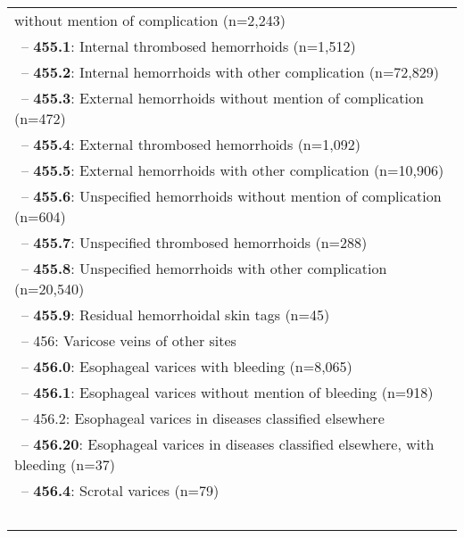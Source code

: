 \begin{longtable}{p{\textwidth}}
without mention of complication (n=2,243)} \\ \-\ \hspace{30pt}\footnotesize{-- {\color{ForestGreen} \textbf{455.1}}: Internal thrombosed hemorrhoids (n=1,512)} \\ \-\ \hspace{30pt}\footnotesize{-- {\color{ForestGreen} \textbf{455.2}}: Internal hemorrhoids with other complication (n=72,829)} \\ \-\ \hspace{30pt}\footnotesize{-- {\color{ForestGreen} \textbf{455.3}}: External hemorrhoids without mention of complication (n=472)} \\ \-\ \hspace{30pt}\footnotesize{-- {\color{ForestGreen} \textbf{455.4}}: External thrombosed hemorrhoids (n=1,092)} \\ \-\ \hspace{30pt}\footnotesize{-- {\color{ForestGreen} \textbf{455.5}}: External hemorrhoids with other complication (n=10,906)} \\ \-\ \hspace{30pt}\footnotesize{-- {\color{ForestGreen} \textbf{455.6}}: Unspecified hemorrhoids without mention of complication (n=604)} \\ \-\ \hspace{30pt}\footnotesize{-- {\color{ForestGreen} \textbf{455.7}}: Unspecified thrombosed hemorrhoids (n=288)} \\ \-\ \hspace{30pt}\footnotesize{-- {\color{ForestGreen} \textbf{455.8}}: Unspecified hemorrhoids with other complication (n=20,540)} \\ \-\ \hspace{30pt}\footnotesize{-- {\color{ForestGreen} \textbf{455.9}}: Residual hemorrhoidal skin tags (n=45)} \\ \-\ \hspace{20pt}\footnotesize{-- 456: Varicose veins of other sites} \\ \-\ \hspace{30pt}\footnotesize{-- {\color{ForestGreen} \textbf{456.0}}: Esophageal varices with bleeding (n=8,065)} \\ \-\ \hspace{30pt}\footnotesize{-- {\color{ForestGreen} \textbf{456.1}}: Esophageal varices without mention of bleeding (n=918)} \\ \-\ \hspace{30pt}\footnotesize{-- 456.2: Esophageal varices in diseases classified elsewhere} \\ \-\ \hspace{40pt}\footnotesize{-- {\color{ForestGreen} \textbf{456.20}}: Esophageal varices in diseases classified elsewhere, with bleeding (n=37)} \\ \-\ \hspace{30pt}\footnotesize{-- {\color{ForestGreen} \textbf{456.4}}: Scrotal varices (n=79)} \\ \-\ \hspace{30pt}\footnotesize{-- {\color{ForestGreen} \textbf{456.5}}: 
\end{longtable}
